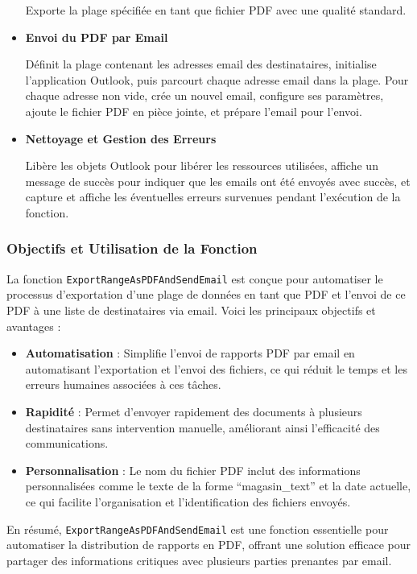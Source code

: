 \documentclass[a4paper, oneside, 12pt, final]{extreport}
\begin{document}
\begin{itemize}
Exporte la plage spécifiée en tant que fichier PDF avec une qualité standard.
\item\textbf{Envoi du PDF par Email}

Définit la plage contenant les adresses email des destinataires, initialise l'application Outlook, puis parcourt chaque adresse email dans la plage. Pour chaque adresse non vide, crée un nouvel email, configure ses paramètres, ajoute le fichier PDF en pièce jointe, et prépare l'email pour l'envoi.

\item\textbf{Nettoyage et Gestion des Erreurs}

Libère les objets Outlook pour libérer les ressources utilisées, affiche un message de succès pour indiquer que les emails ont été envoyés avec succès, et capture et affiche les éventuelles erreurs survenues pendant l'exécution de la fonction.
\end{itemize}

\subsubsection{Objectifs et Utilisation de la Fonction}

La fonction \texttt{ExportRangeAsPDFAndSendEmail} est conçue pour automatiser le processus d'exportation d'une plage de données en tant que PDF et l'envoi de ce PDF à une liste de destinataires via email. Voici les principaux objectifs et avantages :

\begin{itemize}
    \item \textbf{Automatisation} : Simplifie l'envoi de rapports PDF par email en automatisant l'exportation et l'envoi des fichiers, ce qui réduit le temps et les erreurs humaines associées à ces tâches.
    \item \textbf{Rapidité} : Permet d'envoyer rapidement des documents à plusieurs destinataires sans intervention manuelle, améliorant ainsi l'efficacité des communications.
    \item \textbf{Personnalisation} : Le nom du fichier PDF inclut des informations personnalisées comme le texte de la forme ``magasin\_text'' et la date actuelle, ce qui facilite l'organisation et l'identification des fichiers envoyés.
\end{itemize}

En résumé, \texttt{ExportRangeAsPDFAndSendEmail} est une fonction essentielle pour automatiser la distribution de rapports en PDF, offrant une solution efficace pour partager des informations critiques avec plusieurs parties prenantes par email.
\end{document}
